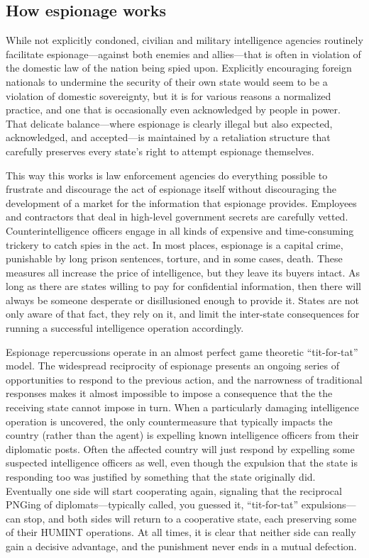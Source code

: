 \documentclass{memoir}
\begin{document}
\begin{refsegment}
\subsection{How espionage works}
While not explicitly condoned, civilian and military intelligence agencies routinely facilitate espionage---against both enemies and allies---that is often in violation of the domestic law of the nation being spied upon. Explicitly encouraging foreign nationals to undermine the security of their own state would seem to be a violation of domestic sovereignty, but it is for various reasons a normalized practice, and one that is occasionally even acknowledged by people in power. That delicate balance---where espionage is clearly illegal but also expected, acknowledged, and accepted---is maintained by a retaliation structure that carefully preserves every state's right to attempt espionage themselves.

This way this works is law enforcement agencies do everything possible to frustrate and discourage the act of espionage itself without discouraging the development of a market for the information that espionage provides. Employees and contractors that deal in high-level government secrets are carefully vetted. Counterintelligence officers engage in all kinds of expensive and time-consuming trickery to catch spies in the act. In most places, espionage is a capital crime, punishable by long prison sentences, torture, and in some cases, death. These measures all increase the price of intelligence, but they leave its buyers intact. As long as there are states willing to pay for confidential information, then there will always be someone desperate or disillusioned enough to provide it. States are not only aware of that fact, they rely on it, and limit the inter-state consequences for running a successful intelligence operation accordingly.

Espionage repercussions operate in an almost perfect game theoretic ``tit-for-tat'' model. The widespread reciprocity of espionage presents an ongoing series of opportunities to respond to the previous action, and the narrowness of traditional responses makes it almost impossible to impose a consequence that the the receiving state cannot impose in turn. When a particularly damaging intelligence operation is uncovered, the only countermeasure that typically impacts the country (rather than the agent) is expelling known intelligence officers from their diplomatic posts. Often the affected country will just respond by expelling some suspected intelligence officers as well, even though the expulsion that the state is responding too was justified by something that the state originally did. Eventually one side will start cooperating again, signaling that the reciprocal PNGing of diplomats---typically called, you guessed it, ``tit-for-tat'' expulsions---can stop, and both sides will return to a cooperative state, each preserving some of their HUMINT operations. At all times, it is clear that neither side can really gain a decisive advantage, and the punishment never ends in a mutual defection.


\end{refsegment}
\end{document}
